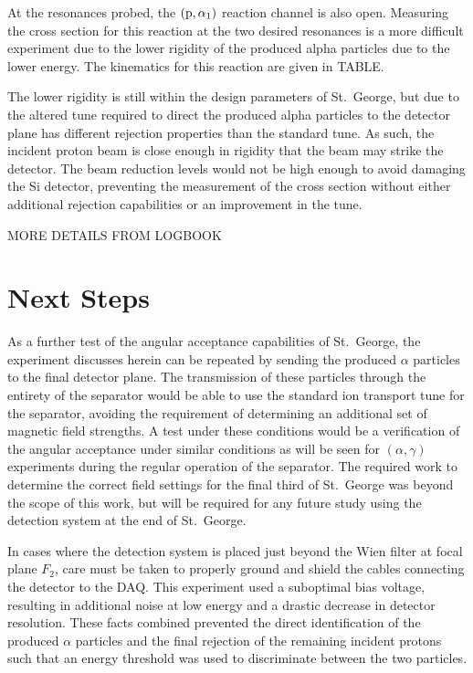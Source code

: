 At the resonances probed, the $(\rm{p},\alpha_1)$ reaction channel is also
open. Measuring the cross section for this reaction at the two desired
resonances is a more difficult experiment due to the lower rigidity of
the produced alpha particles due to the lower energy. The kinematics for
this reaction are given in TABLE.

The lower rigidity is still within the design parameters of St.\ George,
but due to the altered tune required to direct the produced alpha
particles to the detector plane has different rejection properties than
the standard tune. As such, the incident proton beam is close enough in
rigidity that the beam may strike the detector. The beam reduction
levels would not be high enough to avoid damaging the Si detector,
preventing the measurement of the cross section without either
additional rejection capabilities or an improvement in the tune.

MORE DETAILS FROM LOGBOOK


\section{Next Steps}
\label{sec:next-steps}

As a further test of the angular acceptance capabilities of St.\ George, the
experiment discusses herein can be repeated by sending the produced $\alpha$
particles to the final detector plane. The transmission of these particles
through the entirety of the separator would be able to use the standard ion
transport tune for the separator, avoiding the requirement of determining an
additional set of magnetic field strengths. A test under these conditions would
be a verification of the angular acceptance under similar conditions as will
be seen for $(\alpha,\gamma)$ experiments during the regular operation of the
separator. The required work to determine the correct field settings for the
final third of St.\ George was beyond the scope of this work, but will be
required for any future study using the detection system at the end of
St.\ George.

In cases where the detection system is placed just beyond the Wien filter at
focal plane $F_2$, care must be taken to properly ground and shield the cables
connecting the detector to the DAQ. This experiment used a suboptimal bias
voltage, resulting in additional noise at low energy and a drastic decrease in
detector resolution. These facts combined prevented the direct identification
of the produced $\alpha$ particles and the final rejection of the remaining
incident protons such that an energy threshold was used to discriminate between
the two particles.


